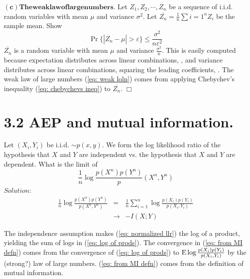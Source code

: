 \documentclass[10pt]{article}
\DeclareMathOperator*{\E}{\mbox{\text{E}}}
\newcommand{\pref}[1]{{(\ref{#1})}}
\begin{document}
\begin{tiny}
\begin{multicols}{3}
$\mathbf{(c) The weak law of large numbers.}$
Let $Z_1,Z_2,\cdots,Z_n$ be a sequence of i.i.d. random variables with mean $\mu$ and variance $\sigma^2$. Let
$\overline{Z_n} = \frac{1}{n}\sum{i=1}^n Z_i$ be the sample mean.
Show 
\begin{equation}
    \Pr \{|\overline{Z_n} - \mu| > \varepsilon\} \leq
    \frac{\sigma^2}{n\varepsilon^2}
    \label{eq: weak loln}
\end{equation}
\proof
$\overline{Z_n}$ is a random variable with mean $\mu$ and variance
$\frac{\sigma^2}{n}$. This is easily computed because expectation
distributes across linear combinations, 
, and variance distributes across linear combinations, squaring the
leading coefficients,
. The weak law of large numbers \pref{eq: weak loln} comes from applying
Chebychev's inequality \pref{eq: chebychevs ineq} to $\overline{Z_n}$.
$\Box$

\section*{3.2 AEP and mutual information.}
Let $(X_i,Y_i)$ be i.i.d. $\sim p(x,y)$. We form the log likelihood ratio
of the hypothesis that $X$ and $Y$ are independent vs. the hypothesis that
$X$ and $Y$ are dependent. What is the limit of
\begin{equation}
    \frac{1}{n}\log \frac{p(X^n)p(Y^n)}p(X^n,Y^n)
    \label{eq: normalized llr}
\end{equation}
$Solution$:
\begin{eqnarray}
    \frac{1}{n}\log \frac{p(X^n)p(Y^n)}{p(X^n,Y^n)}
    &=& \frac{1}{n} \sum_{i=1}^{n} \log \frac{p(X_i)p(Y_i)}{p(X_i,Y_i)}
    \label{eq: log of prods} \\
    &\rightarrow& -I(X;Y) 
    \label{eq: from MI defn}
\end{eqnarray}

The independence assumption makes \pref{eq: normalized llr} the log of a
product, yielding the sum of logs in \pref{eq: log of prods}.
The convergence in \pref{eq: from MI defn} comes from the convergence of
\pref{eq: log of prods} to $\E \log \frac{p(X_i)p(Y_i)}{p(X_i,Y_i)}$ by
the (strong?) law of large numbers. \pref{eq: from MI defn} comes from the
definition of mutual information.


\end{multicols}
\end{tiny}
\end{document}
